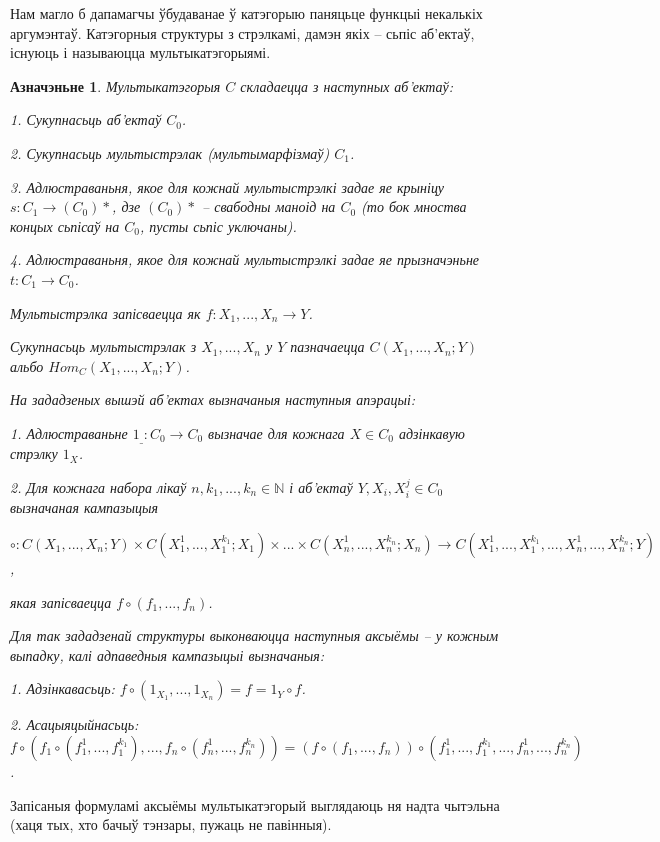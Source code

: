 \documentclass[a4paper,12pt]{book}
\newtheorem{definition}{Азначэньне}[section]
\begin{document}
Нам магло б дапамагчы ўбудаванае ў катэгорыю паняцьце функцыі
некалькіх аргумэнтаў. Катэгорныя структуры з стрэлкамі, дамэн якіх --
сьпіс
аб'ектаў, існуюць і называюцца мультыкатэгорыямі.

\begin{definition}
  Мультыкатэгорыя $C$ складаецца з наступных аб'ектаў:

  1. Сукупнасьць аб'ектаў $C_0$.

  2. Сукупнасьць мультыстрэлак (мультымарфізмаў) $C_1$.

  3. Адлюстраваньня, якое для кожнай мультыстрэлкі задае яе крыніцу
  $s: C_1 \rightarrow (C_0)*$, дзе $(C_0)*$ -- свабодны маноід на
  $C_0$ (то бок мноства концых сьпісаў на $C_0$, пусты сьпіс
  уключаны).

  4. Адлюстраваньня, якое для кожнай мультыстрэлкі задае яе
  прызначэньне $t: C_1 \rightarrow C_0$.

  Мультыстрэлка запісваецца як $f: X_1,...,X_n \rightarrow Y$.

  Сукупнасьць мультыстрэлак з $X_1, ..., X_n$ у $Y$ пазначаецца
  $C(X_1, ..., X_n;Y)$ альбо $Hom_C(X_1, ..., X_n;Y)$.

  На зададзеных вышэй аб'ектах вызначаныя наступныя апэрацыі:

  1. Адлюстраваньне $1_\_: C_0 \rightarrow C_0$ вызначае для кожнага
  $X \in C_0$ адзінкавую стрэлку $1_X$.

  2. Для кожнага набора лікаў $n, k_1, ..., k_n \in \mathbb{N}$ і
  аб'ектаў $Y, X_i, X_i^j \in C_0$ вызначаная кампазыцыя

  $\circ: C(X_1, ..., X_n; Y) \times C(X_1^1, ..., X_1^{k_1}; X_1)
  \times ... \times C(X_n^1, ..., X_n^{k_n}; X_n) \rightarrow C(X_1^1,
  ..., X_1^{k_1}, ..., X_n^1, ..., X_n^{k_n}; Y)$,

  якая запісваецца $f \circ (f_1, ..., f_n)$.

  Для так зададзенай структуры выконваюцца наступныя аксыёмы -- у
  кожным выпадку, калі адпаведныя кампазыцыі вызначаныя:

  1. Адзінкавасьць: $f \circ (1_{X_1}, ..., 1_{X_n}) = f = 1_Y \circ
  f$.

  2. Асацыяцыйнасьць: $f \circ (f_1 \circ (f_1^1, ..., f_1^{k_1}),
  ..., f_n \circ (f_n^1, ..., f_n^{k_n})) = (f \circ (f_1, ..., f_n))
  \circ (f_1^1, ..., f_1^{k_1}, ..., f_n^1, ..., f_n^{k_n})$.
\end{definition}

Запісаныя формуламі аксыёмы мультыкатэгорый выглядаюць ня надта
чытэльна (хаця тых, хто бачыў тэнзары, пужаць не павінныя).
\end{document}
